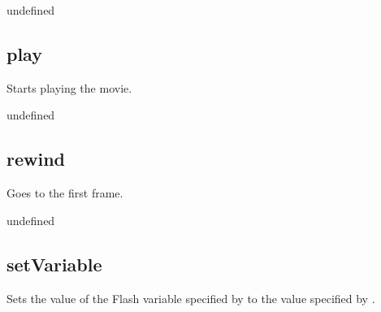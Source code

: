 \documentclass[letterpaper,12pt,english,openany,oneside]{sphinxmanual}
\begin{document}
\label{\detokenize{JS_3D_API:section-28}}\label{\detokenize{JS_3D_API:returns-25}}

undefined


\subsection{play}
\label{\detokenize{JS_3D_API:play}}
Starts playing the movie.

\label{\detokenize{JS_3D_API:syntax-26}}

\begin{sphinxVerbatim}[commandchars=\\\{\}]
\end{sphinxVerbatim}
\label{\detokenize{JS_3D_API:returns-26}}

undefined


\subsection{rewind}
\label{\detokenize{JS_3D_API:rewind}}
Goes to the first frame.

\label{\detokenize{JS_3D_API:syntax-27}}

\begin{sphinxVerbatim}[commandchars=\\\{\}]
\end{sphinxVerbatim}
\label{\detokenize{JS_3D_API:returns-27}}

undefined


\subsection{setVariable}
\label{\detokenize{JS_3D_API:setvariable}}
Sets the value of the Flash variable specified by  to the value specified by .

\label{\detokenize{JS_3D_API:syntax-28}}

\begin{sphinxVerbatim}[commandchars=\\\{\}]
 
\end{sphinxVerbatim}
\label{\detokenize{JS_3D_API:parameters-18}}
\end{document}
